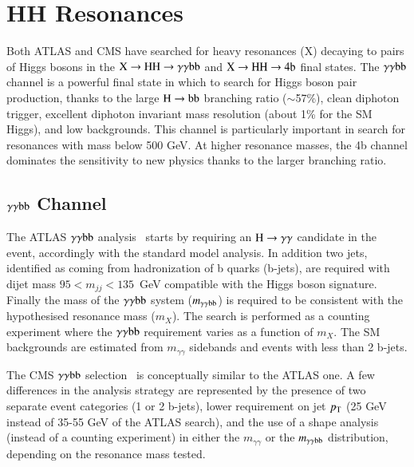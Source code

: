 \documentclass[3p,times,twocolumn]{elsarticle}
\begin{document}
\section{HH Resonances}
\label{sec:HH}

Both ATLAS and CMS have searched for heavy resonances (X) decaying to
pairs of Higgs bosons in the $\rm{X}\rightarrow\rm{HH}\rightarrow \gamma\gamma\rm{bb}$ and $\rm{X}\rightarrow\rm{HH}\rightarrow 4\rm{b}$ final states. 
The $\gamma\gamma\rm{bb}$ channel is a powerful final state in which
to search for Higgs boson pair production, thanks to the large
$\rm{H}\rightarrow\rm{bb}$ branching ratio ($\sim$57\%), clean diphoton trigger,
excellent diphoton invariant mass resolution (about 1\% for the SM Higgs), and low
backgrounds. This channel is particularly important in search for
resonances with mass below 500 GeV. At higher resonance masses, the 4b channel
dominates the sensitivity to new physics thanks to the larger branching ratio.


\subsection{$\gamma\gamma\rm{bb}$ Channel}

The ATLAS $\gamma\gamma\rm{bb}$ analysis~\cite{Aad:2014yja} starts by requiring an
$\rm{H}\rightarrow \gamma\gamma$ candidate in the event, accordingly
with the standard model analysis. In addition two jets, identified as
coming from hadronization of b quarks (b-jets), are required with dijet
mass $95<m_{jj}<135$~GeV compatible with the Higgs boson
signature. Finally the mass of the $\gamma\gamma\rm{bb}$ system
($m_{\gamma\gamma\rm{bb}}$) is required to be consistent with the
hypothesised resonance mass ($m_X$). The search is performed as a counting 
experiment where the  $\gamma\gamma\rm{bb}$ requirement varies as a
function of $m_X$. The SM backgrounds are estimated from
$m_{\gamma\gamma}$ sidebands and events with less than 2 b-jets. 

The CMS $\gamma\gamma\rm{bb}$ selection~\cite{CMS:2014ipa} is conceptually similar to the
ATLAS one. A few differences in the analysis strategy are represented by the presence of
two separate event categories (1 or 2 b-jets), lower requirement on jet $p_{\rm{T}}$
(25 GeV instead of 35-55 GeV of the ATLAS search), and the use of a shape analysis (instead of a
counting experiment) in either the $m_{\gamma\gamma}$ or the
$m_{\gamma\gamma\rm{bb}}$ distribution, depending on the resonance
mass tested.
\end{document}
